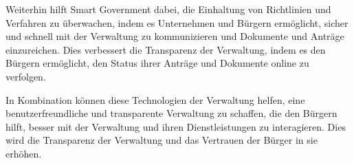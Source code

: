 \par
Weiterhin hilft Smart Government dabei, die Einhaltung von Richtlinien und Verfahren zu überwachen, indem es Unternehmen und Bürgern ermöglicht, sicher und schnell mit der Verwaltung zu kommunizieren und Dokumente und Anträge einzureichen. 
Dies verbessert die Transparenz der Verwaltung, indem es den Bürgern ermöglicht, den Status ihrer Anträge und Dokumente online zu verfolgen.
\par
In Kombination können diese Technologien der Verwaltung helfen, eine benutzerfreundliche und transparente Verwaltung zu schaffen, die den Bürgern hilft, besser mit der Verwaltung und ihren Dienstleistungen zu interagieren. 
Dies wird die Transparenz der Verwaltung und das Vertrauen der Bürger in sie erhöhen.